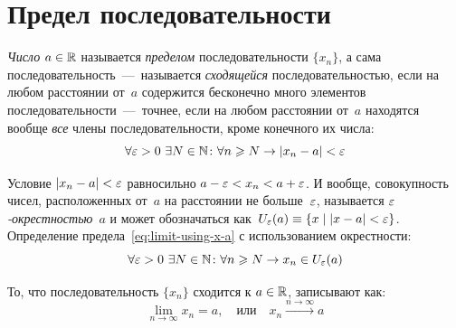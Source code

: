 \documentclass[a4paper,12pt]{article}
\begin{document}
  
  \section{Предел последовательности}\label{seq:limit}
  
  
  
  \emph{Число} $a \hm\in \RR$ называется \emph{пределом} последовательности $\{x_n\}$, а сама последовательность~---~называется \emph{сходящейся} последовательностью, если на любом расстоянии от~$a$ содержится бесконечно много элементов последовательности~---~точнее, если на любом расстоянии от~$a$ находятся вообще \emph{все} члены последовательности, кроме конечного их числа:
  \begin{equation}\label{eq:limit-using-x-a}
    \forall \varepsilon > 0\ \exists N \in \mathbb N\colon \forall n \geqslant N \to |x_n - a| < \varepsilon
  \end{equation}
  
  Условие $|x_n - a| \hm< \eps$ равносильно $a \hm- \eps \hm< x_n \hm< a \hm+ \eps$.
  И вообще, совокупность чисел, расположенных от~$a$ на расстоянии не больше~$\varepsilon$, называется \emph{$\varepsilon$-окрестностью}~$a$ и может обозначаться как~$U_{\eps}(a) \hm\equiv \{x \hm\mid |x \hm- a| \hm< \eps\}$.
  Определение предела~\eqref{eq:limit-using-x-a} с использованием окрестности:
  \begin{equation}\label{eq:limit-using-eps-nei}
    \forall \varepsilon > 0\ \exists N \in \mathbb N\colon \forall n \geqslant N \to x_n \in U_{\varepsilon}(a)
  \end{equation}
  
  То, что последовательность $\{x_n\}$ сходится к $a \hm\in \RR$, записывают как:
  \[
    \lim_{n \to \infty} x_n = a,\quad \mbox{или}\quad x_n \xrightarrow{n \to \infty} a
  \]
    
\end{document}
